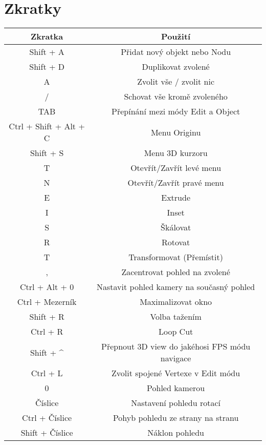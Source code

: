 \documentclass[12pt,a4paper]{report}
\begin{document}
	\section{Zkratky}
	\begin{tabular}{cc}
		\toprule
		Zkratka
& Použití
\\
		\midrule
		Shift + A  & Přidat nový objekt nebo Nodu
\\
		Shift + D & Duplikovat zvolené
\\
		A & Zvolit vše / zvolit nic
\\
		/ & Schovat vše kromě zvoleného
\\
		TAB & Přepínání mezi módy Edit a Object
\\
		Ctrl + Shift + Alt +
C & Menu Originu
\\
		Shift + S & Menu 3D kurzoru
\\
		T & Otevřít/Zavřít levé menu
\\
		N & Otevřít/Zavřít pravé menu
\\
		E & Extrude
\\
		I & Inset
\\
		S & Škálovat
\\
		R & Rotovat
\\
		T & Transformovat (Přemístit)
\\
		, & Zacentrovat pohled na zvolené
\\
		Ctrl + Alt + 0 & Nastavit pohled kamery na současný pohled
\\
		Ctrl + Mezerník & Maximalizovat okno
\\
		Shift + R & Volba tažením
\\
		Ctrl + R & Loop Cut
\\
		Shift + \^ & Přepnout 3D view do jakéhosi FPS módu navigace
\\
		Ctrl + L & Zvolit spojené Vertexe v Edit módu
\\
		0 & Pohled kamerou
\\
		Číslice & Nastavení pohledu rotací
\\
		Ctrl + Číslice & Pohyb pohledu ze strany na stranu
\\
		Shift + Číslice & Náklon pohledu
	\end{tabular}
	
\end{document}
